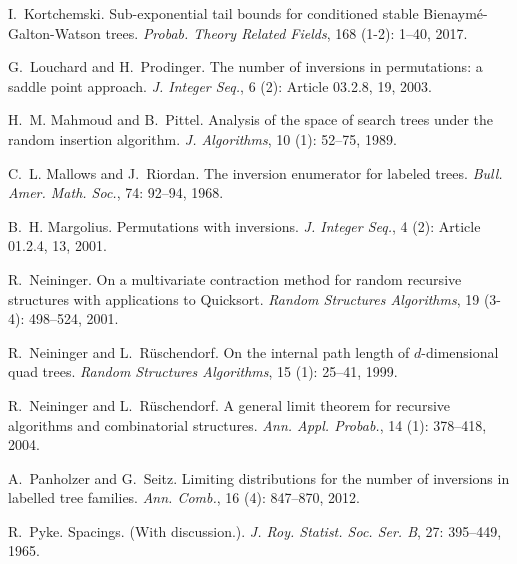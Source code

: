 \documentclass[11pt]{article}
\numberwithin{theorem}{section}
\theoremstyle{definition}
\numberwithin{equation}{section}
\begin{document}
\begin{thebibliography}{55}
I.~Kortchemski.
\newblock Sub-exponential tail bounds for conditioned stable
  {B}ienaym\'e-{G}alton-{W}atson trees.
\newblock \emph{Probab. Theory Related Fields}, 168 (1-2):
  1--40, 2017.

G.~Louchard and H.~Prodinger.
\newblock The number of inversions in permutations: a saddle point approach.
\newblock \emph{J. Integer Seq.}, 6 (2): Article 03.2.8, 19,
  2003.

H.~M. Mahmoud and B.~Pittel.
\newblock Analysis of the space of search trees under the random insertion
  algorithm.
\newblock \emph{J. Algorithms}, 10 (1): 52--75, 1989.

C.~L. Mallows and J.~Riordan.
\newblock The inversion enumerator for labeled trees.
\newblock \emph{Bull. Amer. Math. Soc.}, 74: 92--94, 1968.

B.~H. Margolius.
\newblock Permutations with inversions.
\newblock \emph{J. Integer Seq.}, 4 (2): Article 01.2.4, 13,
  2001.

R.~Neininger.
\newblock On a multivariate contraction method for random recursive structures
  with applications to {Q}uicksort.
\newblock \emph{Random Structures Algorithms}, 19 (3-4):
  498--524, 2001.

R.~Neininger and L.~R\"uschendorf.
\newblock On the internal path length of {$d$}-dimensional quad trees.
\newblock \emph{Random Structures Algorithms}, 15 (1):
  25--41, 1999.

R.~Neininger and L.~R\"uschendorf.
\newblock A general limit theorem for recursive algorithms and combinatorial
  structures.
\newblock \emph{Ann. Appl. Probab.}, 14 (1): 378--418, 2004.

A.~Panholzer and G.~Seitz.
\newblock Limiting distributions for the number of inversions in labelled tree
  families.
\newblock \emph{Ann. Comb.}, 16 (4): 847--870, 2012.

R.~Pyke.
\newblock Spacings. ({W}ith discussion.).
\newblock \emph{J. Roy. Statist. Soc. Ser. B}, 27: 395--449, 1965.


\end{thebibliography}
\end{document}
